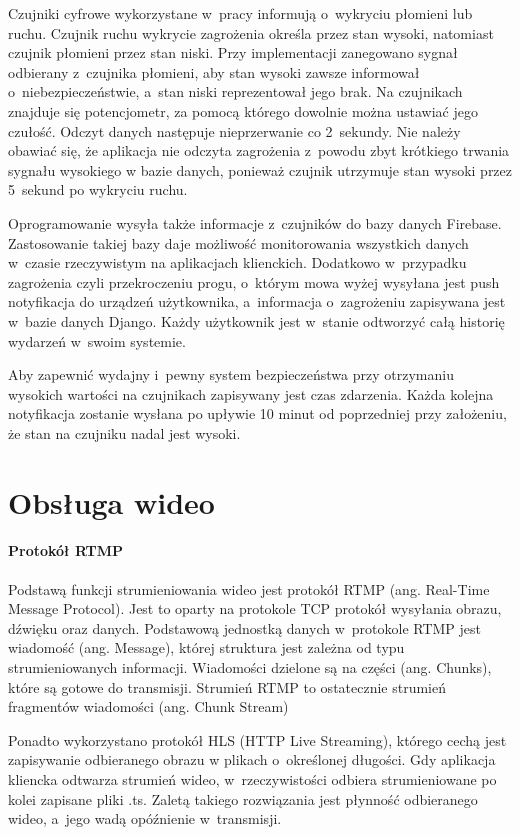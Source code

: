 Czujniki cyfrowe wykorzystane w~pracy informują o~wykryciu płomieni lub ruchu. Czujnik ruchu wykrycie zagrożenia określa przez stan wysoki, natomiast czujnik płomieni przez stan niski. Przy implementacji zanegowano sygnał odbierany z~czujnika płomieni, aby stan wysoki zawsze informował o~niebezpieczeństwie, a~stan niski reprezentował jego brak. Na czujnikach znajduje się potencjometr, za pomocą którego dowolnie można ustawiać jego czułość. Odczyt danych następuje nieprzerwanie co 2~sekundy. Nie należy obawiać się, że aplikacja nie odczyta zagrożenia z~powodu zbyt krótkiego trwania sygnału wysokiego w bazie danych, ponieważ czujnik utrzymuje stan wysoki przez 5~sekund po wykryciu ruchu. 

Oprogramowanie wysyła także informacje z~czujników do bazy danych Firebase. Zastosowanie takiej bazy daje możliwość monitorowania wszystkich danych w~czasie rzeczywistym na aplikacjach klienckich. Dodatkowo w~przypadku zagrożenia czyli przekroczeniu progu, o~którym mowa wyżej wysyłana jest push notyfikacja do urządzeń użytkownika, a~informacja o~zagrożeniu zapisywana jest w~bazie danych Django. Każdy użytkownik jest w~stanie odtworzyć całą historię wydarzeń w~swoim systemie.

Aby zapewnić wydajny i~pewny system bezpieczeństwa przy otrzymaniu wysokich wartości na czujnikach zapisywany jest czas zdarzenia. Każda kolejna notyfikacja zostanie wysłana po upływie 10 minut od poprzedniej przy założeniu, że stan na czujniku nadal jest wysoki. 

\section{Obsługa wideo}

\paragraph{Protokół RTMP}
Podstawą funkcji strumieniowania wideo jest protokół RTMP (ang. Real-Time Message Protocol). Jest to oparty na protokole TCP protokół wysyłania obrazu, dźwięku oraz danych. \cite{MOBILERTMP}
Podstawową jednostką danych w~protokole RTMP jest wiadomość (ang. Message), której struktura jest zależna od typu strumieniowanych informacji. 
Wiadomości dzielone są na części (ang. Chunks), które są gotowe do transmisji. Strumień RTMP to ostatecznie strumień fragmentów wiadomości (ang. Chunk Stream) \cite{STREAMRTMP}

Ponadto wykorzystano protokół HLS (HTTP Live Streaming), którego cechą jest zapisywanie odbieranego obrazu w plikach o~określonej długości. Gdy aplikacja kliencka odtwarza strumień wideo, w~rzeczywistości odbiera strumieniowane po kolei zapisane pliki .ts. Zaletą takiego rozwiązania jest płynność odbieranego wideo, a~jego wadą opóźnienie w~transmisji.

